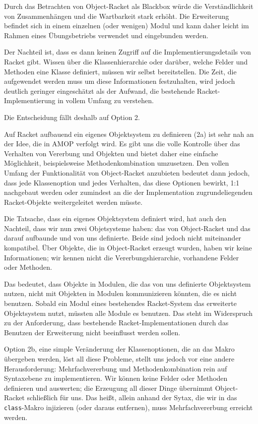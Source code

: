Durch das Betrachten von Object-Racket als Blackbox würde die Verständlichkeit von Zusammenhängen und die Wartbarkeit stark erhöht. Die Erweiterung befindet sich in einem einzelnen (oder wenigen) Modul und kann daher leicht im Rahmen eines Übungsbetriebs verwendet und eingebunden werden.

Der Nachteil ist, dass es dann keinen Zugriff auf die Implementierungsdetails von Racket gibt. Wissen über die Klassenhierarchie oder darüber, welche Felder und Methoden eine Klasse definiert, müssen wir selbst bereitstellen. Die Zeit, die aufgewendet werden muss um diese Informationen festzuhalten, wird jedoch deutlich geringer eingeschätzt als der Aufwand, die bestehende Racket-Implementierung in vollem Umfang zu verstehen. 

Die Entscheidung fällt deshalb auf Option 2.

Auf Racket aufbauend ein eigenes Objektsystem zu definieren (2a) ist sehr nah an der Idee, die in AMOP verfolgt wird. Es gibt uns die volle Kontrolle über das Verhalten von Vererbung und Objekten und bietet daher eine einfache Möglichkeit, beispielsweise Methodenkombination umzusetzen. Den vollen Umfang der Funktionalität von Object-Racket anzubieten bedeutet dann jedoch, dass jede Klassenoption und jedes Verhalten, das diese Optionen bewirkt, 1:1 nachgebaut werden oder zumindest an die der Implementation zugrundeliegenden Racket-Objekte weitergeleitet werden müsste.

Die Tatsache, dass ein eigenes Objektsystem definiert wird, hat auch den Nachteil, dass wir nun zwei Objetsysteme haben: das von Object-Racket und das darauf aufbaunde und von uns definierte. Beide sind jedoch nicht miteinander kompatibel. Über Objekte, die in Object-Racket erzeugt wurden, haben wir keine Informationen; wir kennen nicht die Vererbungshierarchie, vorhandene Felder oder Methoden. 

Das bedeutet, dass Objekte in Modulen, die das von uns definierte Objektsystem nutzen, nicht mit Objekten in Modulen kommunizieren könnten, die es nicht benutzen. Sobald ein Modul eines bestehendes Racket-System das erweiterte Objektsystem nutzt, müssten alle Module es benutzen. Das steht im Widerspruch zu der Anforderung, dass bestehende Racket-Implementationen durch das Benutzen der Erweiterung nicht beeinflusst werden sollen.

Option 2b, eine simple Veränderung der Klassenoptionen, die an das Makro übergeben werden, löst all diese Probleme, stellt uns jedoch vor eine andere Herausforderung: Mehrfachvererbung und Methodenkombination rein auf Syntaxebene zu implementieren. Wir können keine Felder oder Methoden definieren und auswerten; die Erzeugung all dieser Dinge übernimmt Object-Racket schließlich für uns. Das heißt, allein anhand der Sytax, die wir in das \texttt{class}-Makro injizieren (oder daraus entfernen), muss Mehrfachvererbung erreicht werden.

